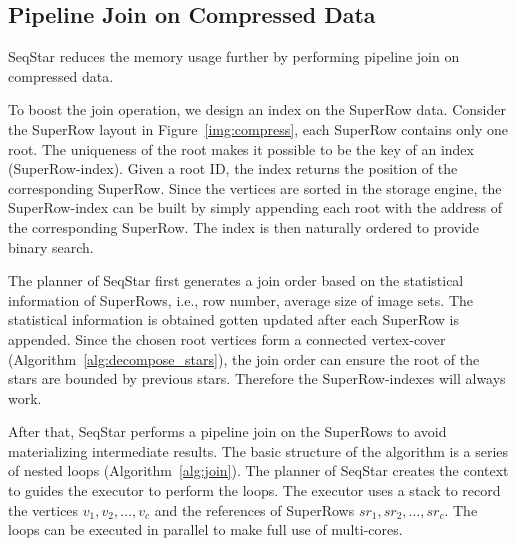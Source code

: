 \subsection{Pipeline Join on Compressed Data}\label{sec:match_join}
SeqStar reduces the memory usage further by performing pipeline join on compressed data.

To boost the join operation, we design an index on the SuperRow data.
Consider the SuperRow layout in Figure~\ref{img:compress}, each SuperRow contains only one root.
The uniqueness of the root makes it possible to be the key of an index (SuperRow-index).
Given a root ID, the index returns the position of the corresponding SuperRow.
Since the vertices are sorted in the storage engine, the SuperRow-index can be built by simply appending each root with the address of the corresponding SuperRow. The index is then naturally ordered to provide binary search.

The planner of SeqStar first generates a join order based on the statistical information of SuperRows,
i.e., row number, average size of image sets.
The statistical information is obtained gotten updated after each SuperRow is appended.
Since the chosen root vertices form a connected vertex-cover (Algorithm~\ref{alg:decompose_stars}),
the join order can ensure the root of the stars are bounded by previous stars.
Therefore the SuperRow-indexes will always work.

After that, SeqStar performs a pipeline join on the SuperRows to avoid materializing intermediate results.
The basic structure of the algorithm is a series of nested loops (Algorithm~\ref{alg:join}).
The planner of SeqStar creates the context to guides the executor to perform the loops.
The executor uses a stack to record the vertices $v_1, v_2, \dots, v_c$ and the references of SuperRows $sr_1, sr_2, \dots, sr_c$.
The loops can be executed in parallel to make full use of multi-cores.

